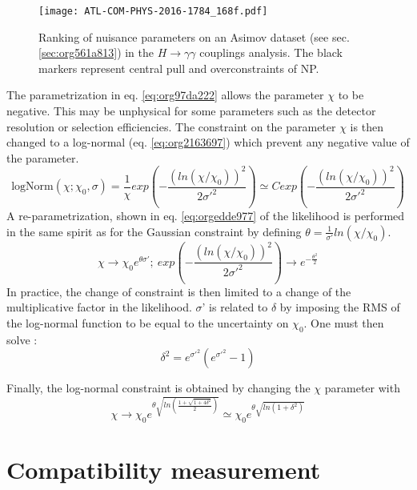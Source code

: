 \begin{figure}[htbp]
\centering
\texttt{[image: ATL-COM-PHYS-2016-1784\_168f.pdf]}
\caption{\label{fig:orgc0d4446}
Ranking of nuisance parameters on an Asimov dataset (see sec. \ref{sec:org561a813}) in the \(H\rightarrow\gamma\gamma\) couplings analysis. The black markers represent central pull and overconstraints of NP.\cite{ATL-COM-PHYS-2016-1784}}
\end{figure}


The parametrization in eq. \ref{eq:org97da222} allows the parameter \(\chi\) to be negative.
This may be unphysical for some parameters such as the detector resolution or selection efficiencies.
The constraint on the parameter \(\chi\) is then changed to a log-normal (eq. \ref{eq:org2163697}) which prevent any negative value of the parameter.
\begin{equation}
\label{eq:org2163697}
\text{logNorm}(\chi; \chi_0, \sigma) = \frac{1}{\chi} exp \left( - \frac{(ln (\chi/\chi_0))^2}{2\sigma'^2}   \right) \simeq C exp \left( - \frac{(ln (\chi/\chi_0))^2}{2\sigma'^2} \right)
\end{equation}
A re-parametrization, shown in eq. \ref{eq:orgedde977} of the likelihood is performed in the same spirit as for the Gaussian constraint by defining \(\theta = \frac{1}{\sigma'} ln(\chi/\chi_0)\).
\begin{equation}
\label{eq:orgedde977}
\chi\rightarrow\chi_0e^{\theta\sigma'}; \ exp \left( - \frac{(ln (\chi/\chi_0))^2}{2\sigma'^2} \right) \rightarrow e^{-\frac{\theta^2}{2}}
\end{equation}
In practice, the change of constraint is then limited to a change of the multiplicative factor in the likelihood.
\(\sigma\)' is related to \(\delta\) by imposing the RMS of the log-normal function to be equal to the uncertainty on \(\chi_{\text{0}}\).
One must then solve :
\begin{equation}
\delta^2 = e^{\sigma'^2}(e^{\sigma'^2}-1)
\end{equation}


Finally, the log-normal constraint is obtained by changing the \(\chi\) parameter with
\begin{equation}
\label{eq:org9060827}
\chi\rightarrow\chi_0 e^{\theta\sqrt{ln\left(\frac{1+\sqrt{1+4\delta^2}}{2}\right)}} \simeq \chi_0 e^{\theta\sqrt{ln(1+\delta^2)}}
\end{equation}


\section{Compatibility measurement}
\label{sec:orga82e3f9}
\label{sec:stat_confidenceInterval}
